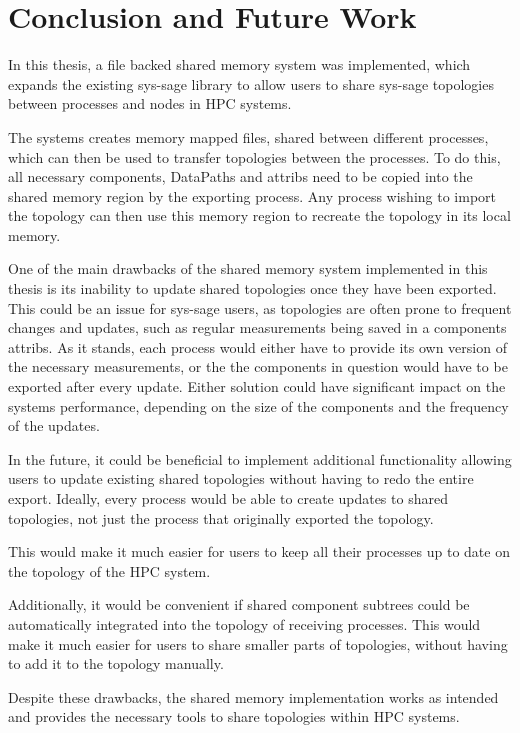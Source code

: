 \chapter{Conclusion and Future Work}
In this thesis, a file backed shared memory system was implemented,
which expands the existing sys-sage library to allow users to share sys-sage topologies between processes and nodes in HPC systems.

The systems creates memory mapped files, shared between different processes, which can then be used to transfer topologies between the processes.
To do this, all necessary components, DataPaths and attribs need to be copied into the shared memory region by the exporting process.
Any process wishing to import the topology can then use this memory region to recreate the topology in its local memory.

One of the main drawbacks of the shared memory system implemented in this thesis is its inability to update shared topologies once they have been exported.
This could be an issue for sys-sage users, as topologies are often prone to frequent changes and updates, such as regular measurements being saved in a components attribs.
As it stands, each process would either have to provide its own version of the necessary measurements, or the the components in question would have to be exported after every update.
Either solution could have significant impact on the systems performance, depending on the size of the components and the frequency of the updates.

In the future, it could be beneficial to implement additional functionality allowing users to update existing shared topologies without having to redo the entire export.
Ideally, every process would be able to create updates to shared topologies, not just the process that originally exported the topology.

This would make it much easier for users to keep all their processes up to date on the topology of the HPC system.

Additionally, it would be convenient if shared component subtrees could be automatically integrated into the topology of receiving processes.
This would make it much easier for users to share smaller parts of topologies, without having to add it to the topology manually.

Despite these drawbacks, the shared memory implementation works as intended and provides the necessary tools to share topologies within HPC systems.